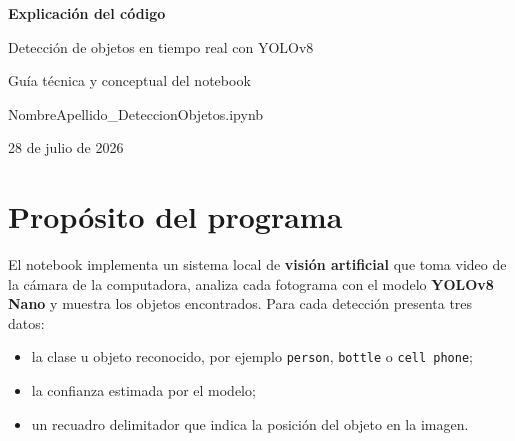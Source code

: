 \documentclass[11pt,a4paper]{article}
\newcommand{\concepto}[1]{\textcolor{Primary}{\textbf{#1}}}
\begin{document}
\hypersetup{pageanchor=false}

\begin{titlepage}
  \pagecolor{Primary}
  \color{white}
  \vspace*{2.1cm}

  {\Huge\bfseries Explicación del código\par}
  \vspace{0.45cm}
  {\LARGE Detección de objetos en tiempo real con YOLOv8\par}

  \vspace{1.2cm}
  {\large Guía técnica y conceptual del notebook\par}
  \vspace{0.25cm}
  {\large\ttfamily NombreApellido\_DeteccionObjetos.ipynb\par}

  \vfill


  \vfill
  {\large 28 de julio de 2026\par}
  \vspace{0.6cm}
\end{titlepage}
\nopagecolor
\color{DarkGray}
\hypersetup{pageanchor=true}

\tableofcontents
\newpage
{}

\section{Propósito del programa}

El notebook implementa un sistema local de \concepto{visión artificial} que toma
video de la cámara de la computadora, analiza cada fotograma con el modelo
\concepto{YOLOv8 Nano} y muestra los objetos encontrados. Para cada detección
presenta tres datos:

\begin{itemize}
  \item la clase u objeto reconocido, por ejemplo \texttt{person},
  \texttt{bottle} o \texttt{cell phone};
  \item la confianza estimada por el modelo;
  \item un recuadro delimitador que indica la posición del objeto en la imagen.
\end{itemize}
\end{document}
